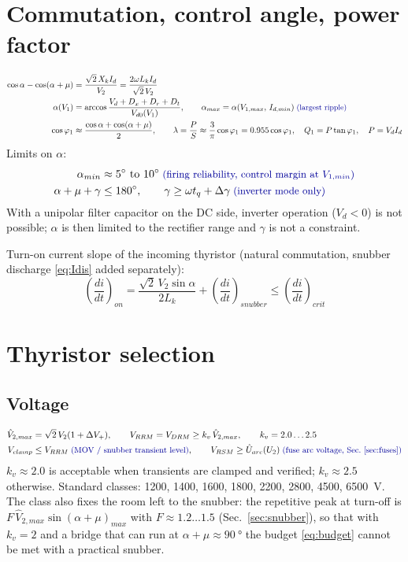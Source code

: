 \documentclass[10pt,a4paper]{scrartcl}
\newcommand{\Vdo}{V_{d0}}
\newcommand{\Vd}{V_{d}}
\newcommand{\Id}{I_{d}}
\newcommand{\Vll}{V_{2}}
\newcommand{\Xk}{X_{k}}
\newcommand{\Lk}{L_{k}}
\newcommand{\Dx}{D_{x}}
\newcommand{\Dr}{D_{r}}
\newcommand{\Dt}{D_{t}}
\newcommand{\VRRM}{V_{RRM}}
\newcommand{\VRSM}{V_{RSM}}
\newcommand{\VDRM}{V_{DRM}}
\newcommand{\rt}[1]{\text{\small\color{blue!60!black} #1}}
\begin{document}
\section{Commutation, control angle, power factor}
\begin{align}
\cos\alpha - \cos(\alpha+\mu) &= \frac{\sqrt2\,\Xk\Id}{\Vll} = \frac{2\omega\Lk\Id}{\sqrt2\,\Vll} \label{eq:mu}\\
\alpha(V_1) &= \arccos\frac{\Vd + \Dx + \Dr + \Dt}{\Vdo(V_1)}, \qquad
\alpha_{max} = \alpha(V_{1,max},\,I_{d,min}) \;\rt{(largest ripple)} \label{eq:alpha}\\
\cos\varphi_1 &\approx \frac{\cos\alpha + \cos(\alpha+\mu)}{2}, \qquad
\lambda = \frac{P}{S} \approx \frac{3}{\pi}\cos\varphi_1 = 0.955\cos\varphi_1, \quad
Q_1 = P\tan\varphi_1,\quad P = \Vd\Id \label{eq:pf}
\end{align}
Limits on $\alpha$:
\begin{align}
\alpha_{min} &\approx \SIrange{5}{10}{\degree} \;\rt{(firing reliability, control margin at $V_{1,min}$)} \\
\alpha + \mu + \gamma &\le \SI{180}{\degree},\qquad \gamma \ge \omega t_q + \Delta\gamma \;\rt{(inverter mode only)} \label{eq:gamma}
\end{align}
With a unipolar filter capacitor on the DC side, inverter operation ($\Vd<0$) is not possible; $\alpha$ is then limited to the rectifier range and $\gamma$ is not a constraint.

Turn-on current slope of the incoming thyristor (natural commutation, snubber discharge \eqref{eq:Idis} added separately):
\begin{equation}
\left(\frac{di}{dt}\right)_{on} = \frac{\sqrt2\,\Vll\sin\alpha}{2\Lk} + \left(\frac{di}{dt}\right)_{snubber} \le \left(\frac{di}{dt}\right)_{crit} \label{eq:didt}
\end{equation}

\section{Thyristor selection}
\subsection{Voltage}
\begin{align}
\hat V_{2,max} &= \sqrt2\,\Vll(1+\Delta V_+), \qquad
\VRRM = \VDRM \ge k_v\,\hat V_{2,max}, \qquad k_v = 2.0\ldots2.5 \label{eq:VRRM}\\
V_{clamp} &\le \VRRM \;\rt{(MOV / snubber transient level)}, \qquad
\VRSM \ge \hat U_{arc}(U_2) \;\rt{(fuse arc voltage, Sec.~\ref{sec:fuses})}
\end{align}
$k_v\approx2.0$ is acceptable when transients are clamped and verified; $k_v\approx2.5$ otherwise. Standard classes: 1200, 1400, 1600, 1800, 2200, 2800, 4500, 6500~V. The class also fixes the room left to the snubber: the repetitive peak at turn-off is $F\,\hat V_{2,max}\sin(\alpha+\mu)_{max}$ with $F \approx 1.2\ldots1.5$ (Sec.~\ref{sec:snubber}), so that with $k_v = 2$ and a bridge that can run at $\alpha+\mu \approx \SI{90}{\degree}$ the budget \eqref{eq:budget} cannot be met with a practical snubber.
\end{document}
